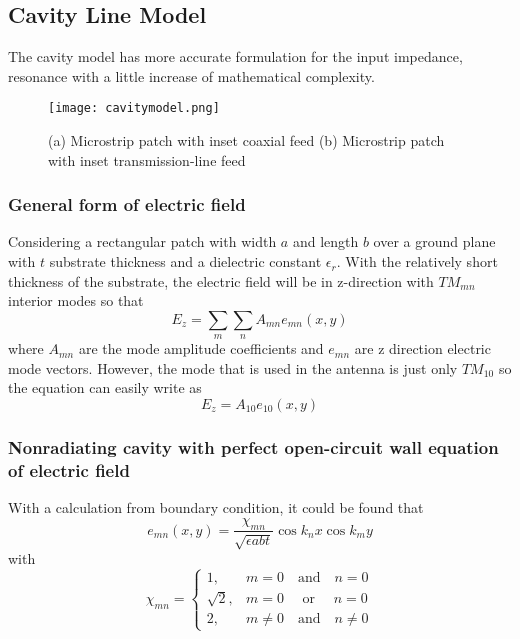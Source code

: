 \subsection{Cavity Line Model}
\indent The cavity model has more accurate formulation for the input impedance, resonance with a little
        increase of mathematical complexity.\cite{CaM:81}
\begin{figure}[ht]
  \label{cavitymodel}
  \texttt{[image: cavitymodel.png]}
  \centering
  \caption{(a) Microstrip patch with inset coaxial feed
           (b) Microstrip patch with inset transmission-line feed
          }
\end{figure}

  \subsubsection{General form of electric field}
    \indent Considering a rectangular patch with width $a$ and length $b$ over a ground plane with $t$ substrate
            thickness and a dielectric constant $\epsilon_r$. With the relatively short thickness of the substrate,
            the electric field will be in z-direction with $TM_{mn}$ interior modes so that\cite{CaM:81}
    \begin{equation}
      \label{GeneralE}
      E_z = \sum_m\sum_n A_{mn}e_{mn}(x,y)
    \end{equation}
    \indent where $A_{mn}$ are the mode amplitude coefficients and $e_{mn}$ are z direction electric mode vectors.
    \indent However, the mode that is used in the antenna is just only $TM_{10}$ so the equation can easily write as
    \begin{equation}
       E_z = A_{10}e_{10}(x,y)
    \end{equation}

  \subsubsection{Nonradiating cavity with perfect open-circuit wall equation of electric field}
    \indent With a calculation from boundary condition, it could be found that
      \begin{equation}
        \label{OpenE}
        e_{mn}(x,y) = \frac{\chi_{mn}}{\sqrt{\epsilon abt}}\cos{k_nx}\cos{k_my}
      \end{equation}
    \indent with
      \begin{equation}
        \chi_{mn}=
        \begin{cases}
          1       , & m = 0\quad     \text{and}\quad  n = 0 \\
          \sqrt{2}, & m = 0\quad     \text{ or }\quad  n = 0 \\
          2       , & m \neq 0\quad  \text{and}\quad  n \neq 0
        \end{cases}
      \end{equation}

